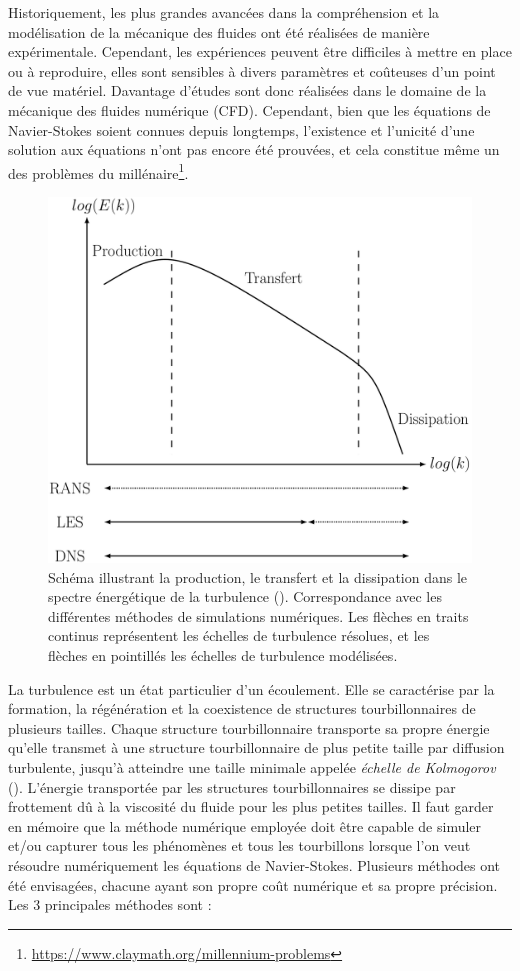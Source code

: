 Historiquement, les plus grandes avancées dans la compréhension et la modélisation de la mécanique des fluides ont été réalisées de manière expérimentale. Cependant, les expériences peuvent être difficiles à mettre en place ou à reproduire, elles sont sensibles à divers paramètres et coûteuses d'un point de vue matériel. Davantage d'études sont donc réalisées dans le domaine de la mécanique des fluides numérique (CFD). Cependant, bien que les équations de Navier-Stokes soient connues depuis longtemps, l'existence et l'unicité d'une solution aux équations n'ont pas encore été prouvées, et cela constitue même un des problèmes du millénaire\footnote{\url{https://www.claymath.org/millennium-problems}}.

\begin{figure}[!hbtp]
    \centering
    \includegraphics[width=0.7\linewidth]{Chap2/Pictures/Energy_cascade.pdf}
    \caption{Schéma illustrant la production, le transfert et la dissipation dans le spectre énergétique de la turbulence (\cite{kolmogorov1941}). Correspondance avec les différentes méthodes de simulations numériques. Les flèches en traits continus représentent les échelles de turbulence résolues, et les flèches en pointillés les échelles de turbulence modélisées.}
    \label{fig/Energy_cascade_schema}
\end{figure}

La turbulence est un état particulier d'un écoulement. Elle se caractérise par la formation, la régénération et la coexistence de structures tourbillonnaires de plusieurs tailles. Chaque structure tourbillonnaire transporte sa propre énergie qu'elle transmet à une structure tourbillonnaire de plus petite taille par diffusion turbulente, jusqu'à atteindre une taille minimale appelée \textit{échelle de Kolmogorov} (\cite{kolmogorov1941}). L'énergie transportée par les structures tourbillonnaires se dissipe par frottement dû à la viscosité du fluide pour les plus petites tailles. Il faut garder en mémoire que la méthode numérique employée doit être capable de simuler et/ou capturer tous les phénomènes et tous les tourbillons lorsque l'on veut résoudre numériquement les équations de Navier-Stokes. Plusieurs méthodes ont été envisagées, chacune ayant son propre coût numérique et sa propre précision. Les 3 principales méthodes sont :

